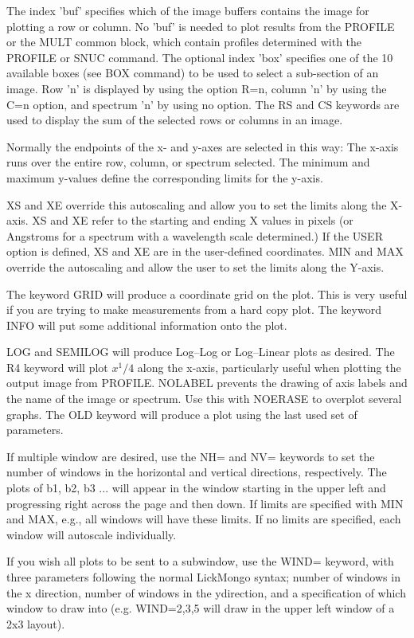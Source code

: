 The index 'buf' specifies which of the image buffers contains the image for
plotting a row or column. No 'buf' is needed to plot results from the
PROFILE or the MULT common block, which contain profiles determined with
the PROFILE or SNUC command.  The optional index 'box' specifies one of the
10 available boxes (see BOX command) to be used to select a sub-section of
an image. Row 'n' is displayed by using the option R=n, column 'n' by using
the C=n option, and spectrum 'n' by using no option. The RS and CS keywords
are used to display the sum of the selected rows or columns in an image.

Normally the endpoints of the x- and y-axes are selected in this way: The
x-axis runs over the entire row, column, or spectrum selected. The minimum
and maximum y-values define the corresponding limits for the y-axis.

XS and XE override this autoscaling and allow you to set the limits along
the X-axis.  XS and XE refer to the starting and ending X values in pixels
(or Angstroms for a spectrum with a wavelength scale determined.)  If the
USER option is defined, XS and XE are in the user-defined coordinates.
MIN and MAX override the autoscaling and allow the user to set the limits
along the Y-axis.

The keyword GRID will produce a coordinate grid on the plot.  This is very
useful if you are trying to make measurements from a hard copy plot.  The
keyword INFO will put some additional information onto the plot.

LOG and SEMILOG will produce Log--Log or Log--Linear plots as desired.  The
R4 keyword will plot $x^1/4$ along the x-axis, particularly useful when
plotting the output image from PROFILE. NOLABEL prevents the drawing of
axis labels and the name of the image or spectrum.  Use this with NOERASE
to overplot several graphs.  The OLD keyword will produce a plot using the
last used set of parameters.

If multiple window are desired, use the NH= and NV= keywords to set the
number of windows in the horizontal and vertical directions,
respectively. The plots of b1, b2, b3 ... will appear in the window
starting in the upper left and progressing right across the page and then
down. If limits are specified with MIN and MAX, e.g., all windows will have
these limits. If no limits are specified, each window will autoscale
individually.

If you wish all plots to be sent to a subwindow, use the WIND= keyword,
with three parameters following the normal LickMongo syntax; number of
windows in the x direction, number of windows in the ydirection, and
a specification of which window to draw into (e.g. WIND=2,3,5 will
draw in the upper left window of a 2x3 layout).

